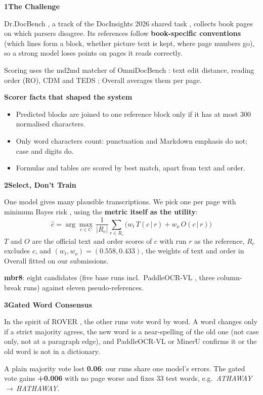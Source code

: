 \documentclass{article}
\newcommand{\up}[1]{\textcolor{green!45!black}{\textbf{#1}}}
\newcommand{\dn}[1]{\textcolor{red!65!black}{\textbf{#1}}}
\newcommand{\blk}[2]{%
  \par\vspace{8mm}%
  {\fontsize{44}{50}\selectfont\bfseries\textcolor{accent}{#1\hspace{6mm}#2}}\par
  \vspace{-2mm}{\color{accent}\rule{\linewidth}{1mm}}\par\vspace{0mm}}
\begin{document}
\noindent
\begin{minipage}[t]{245mm}
\blk{1}{The Challenge}
Dr.DocBench \citep{drdocbench}, a track of the DocInsights 2026 shared task \citep{docinsights2026}, collects book pages on which parsers disagree. Its references follow \textbf{book-specific conventions} (which lines form a block, whether picture text is kept, where page numbers go), so a strong model loses points on pages it reads correctly.

Scoring uses the md2md matcher of OmniDocBench \citep{omnidocbench}: text edit distance, reading order (RO), CDM \citep{cdm} and TEDS \citep{teds}; Overall averages them per page.

\begin{keybox}
\textbf{\textcolor{accent}{Scorer facts that shaped the system}}
\begin{itemize}
  \item Predicted blocks are joined to one reference block only if it has at most 300 normalised characters.
  \item Only word characters count: punctuation and Markdown emphasis do not; case and digits do.
  \item Formulas and tables are scored by best match, apart from text and order.
\end{itemize}
\end{keybox}

\blk{2}{Select, Don't Train}
One model gives many plausible transcriptions. We pick one per page with minimum Bayes risk \citep{kumar-byrne-2004-minimum}, using the \textbf{metric itself as the utility}:
\[ \hat{c} = \arg\max_{c\in C}\, \frac{1}{|R_c|}\sum_{r\in R_c} \big(w_t\,T(c\,|\,r) + w_o\,O(c\,|\,r)\big) \]
$T$ and $O$ are the official text and order scores of $c$ with run $r$ as the reference, $R_c$ excludes $c$, and $(w_t,w_o)=(0.558,0.433)$, the weights of text and order in Overall fitted on our submissions.

\textbf{mbr8}: eight candidates (five base runs incl.\ PaddleOCR-VL \citep{paddleocrvl}, three column-break runs) against eleven pseudo-references.

\blk{3}{Gated Word Consensus}
In the spirit of ROVER \citep{fiscus1997rover}, the other runs vote word by word. A word changes only if a strict majority agrees, the new word is a near-spelling of the old one (not case only, not at a paragraph edge), and PaddleOCR-VL or MinerU \citep{mineru} confirms it or the old word is not in a dictionary.

A plain majority vote lost \dn{0.06}: our runs share one model's errors. The gated vote gains \up{+0.006} with no page worse and fixes 33 test words, e.g.\ \emph{ATHAWAY}\,$\to$\,\emph{HATHAWAY}.
\end{minipage}%
\end{document}

